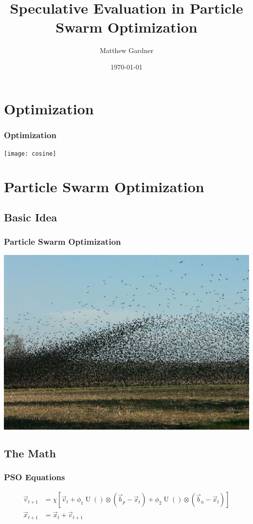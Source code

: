 \documentclass{beamer}
\title{Speculative Evaluation in Particle Swarm Optimization}
\author{Matthew Gardner}
\date{\today}
\DeclareMathOperator{\URand}{U}
\providecommand{\ppos}{\ensuremath{\Vec{x}}}
\providecommand{\pvel}{\ensuremath{\Vec{v}}}
\providecommand{\nbest}{\ensuremath{\Vec{b}_n}}
\providecommand{\pbest}{\ensuremath{\Vec{b}_p}}
\providecommand{\constriction}{\ensuremath{\chi}}
\providecommand{\coeff}{\ensuremath{\phi}}
\begin{document}
\begin{frame}
  \titlepage
\end{frame}

\section{Optimization}
\begin{frame}
  \frametitle{Optimization}
  \texttt{[image: cosine]}
\end{frame}

\section{Particle Swarm Optimization}
\subsection{Basic Idea}
\begin{frame}
  \frametitle{Particle Swarm Optimization}
  \includegraphics[width=\textwidth]{birds}
\end{frame}

\subsection{The Math}
\begin{frame}
  \frametitle{PSO Equations}
  \begin{align*}
	  \pvel_{t+1} &=
		  \constriction \left[ \pvel_t +
			  \coeff_1\URand()\otimes(\pbest - \ppos_t) +
			  \coeff_2\URand()\otimes(\nbest - \ppos_t)
		  \right] \\
	  \ppos_{t+1} &= \ppos_t + \pvel_{t+1}
  \end{align*}
\end{frame}
\end{document}
